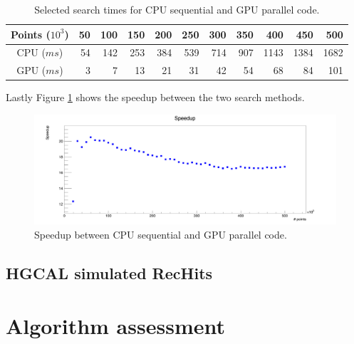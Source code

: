 \begin{center}
\begin{table}[h]
\begin{tabular}{ c || r r r r r r r r r r }
Points ($10^{3}$) & 50 & 100 & 150 & 200 & 250 & 300 & 350 & 400 & 450 & 500 \\
\hline
CPU ($\unit{ms}$) & 54 & 142 & 253 & 384 & 539 & 714 & 907 & 1143 & 1384 & 1682 \\
GPU ($\unit{ms}$) & 3 & 7 & 13 & 21 & 31 & 42 & 54 & 68 & 84 & 101 \\
\end{tabular}
\caption{Selected search times for CPU sequential and GPU parallel code.}
\label{fkdtree_times_tab}
\end{table}
\end{center}

Lastly Figure \ref{fkdtree_speedup} shows the speedup between the two search methods.\\
\begin{figure}
\includegraphics[width=\textwidth]{fkdtree/fkdSpeedup.png}
\caption{Speedup between CPU sequential and GPU parallel code.}
\label{fkdtree_speedup}
\end{figure}

\subsection{HGCAL simulated RecHits}

\section{Algorithm assessment}